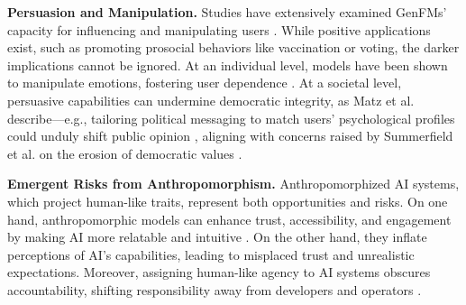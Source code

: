 \textbf{Persuasion and Manipulation.} Studies have extensively examined GenFMs' capacity for influencing and manipulating users \cite{ramani2024persuasion, rogiers2024persuasion, matz2024potential, singh2024measuring}. While positive applications exist, such as promoting prosocial behaviors like vaccination or voting, the darker implications cannot be ignored. At an individual level, models have been shown to manipulate emotions, fostering user dependence \cite{salvi2024ai, salvi2024conversational}. At a societal level, persuasive capabilities can undermine democratic integrity, as Matz et al. describe—e.g., tailoring political messaging to match users' psychological profiles could unduly shift public opinion \cite{matz2024potential}, aligning with concerns raised by Summerfield et al. on the erosion of democratic values \cite{summerfield2024will}. 

\textbf{Emergent Risks from Anthropomorphism.} Anthropomorphized AI systems, which project human-like traits, represent both opportunities and risks. On one hand, anthropomorphic models can enhance trust, accessibility, and engagement by making AI more relatable and intuitive \cite{deshpande2023anthropomorphization, chen2024persona}. On the other hand, they inflate perceptions of AI's capabilities, leading to misplaced trust and unrealistic expectations. Moreover, assigning human-like agency to AI systems obscures accountability, shifting responsibility away from developers and operators \cite{placani2024anthropomorphism, deshpande2023anthropomorphization}.


